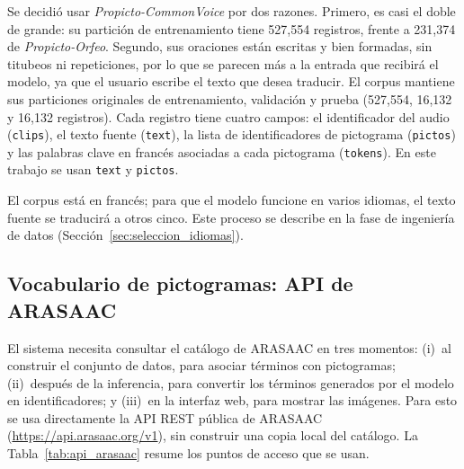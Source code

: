Se decidió usar \textit{Propicto-CommonVoice} por dos razones. Primero, es casi el doble de grande: su partición de entrenamiento tiene 527,554 registros, frente a 231,374 de \textit{Propicto-Orfeo}. Segundo, sus oraciones están escritas y bien formadas, sin titubeos ni repeticiones, por lo que se parecen más a la entrada que recibirá el modelo, ya que el usuario escribe el texto que desea traducir. El corpus mantiene sus particiones originales de entrenamiento, validación y prueba (527,554, 16,132 y 16,132 registros). Cada registro tiene cuatro campos: el identificador del audio (\texttt{clips}), el texto fuente (\texttt{text}), la lista de identificadores de pictograma (\texttt{pictos}) y las palabras clave en francés asociadas a cada pictograma (\texttt{tokens}). En este trabajo se usan \texttt{text} y \texttt{pictos}.

El corpus está en francés; para que el modelo funcione en varios idiomas, el texto fuente se traducirá a otros cinco. Este proceso se describe en la fase de ingeniería de datos (Sección~\ref{sec:seleccion_idiomas}).

\subsection{Vocabulario de pictogramas: API de ARASAAC}
\label{sec:api_arasaac}

El sistema necesita consultar el catálogo de ARASAAC en tres momentos: (i)~al construir el conjunto de datos, para asociar términos con pictogramas; (ii)~después de la inferencia, para convertir los términos generados por el modelo en identificadores; y (iii)~en la interfaz web, para mostrar las imágenes. Para esto se usa directamente la API REST pública de ARASAAC (\url{https://api.arasaac.org/v1}), sin construir una copia local del catálogo. La Tabla~\ref{tab:api_arasaac} resume los puntos de acceso que se usan.

